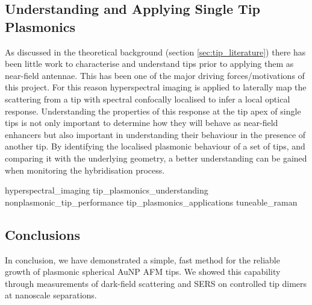 \documentclass[12pt, a4paper, twoside]{book}
\begin{document}
\begin{singlespace}
\chapter{Understanding and Applying Single Tip Plasmonics}
\end{singlespace}


As discussed in the theoretical background (section \ref{sec:tip_literature}) there has been little work to characterise and understand tips prior to applying them as near-field antennae. This has been one of the major {\color{red}driving forces/motivations} of this project. For this reason hyperspectral imaging is applied to laterally map the scattering from a tip with spectral confocally localised to infer a local optical response.
Understanding the properties of this response at the tip apex of single tips is not only important to determine how they will behave as near-field enhancers but also important in understanding their behaviour in the presence of another tip. By identifying the localised plasmonic behaviour of a set of tips, and comparing it with the underlying geometry, a better understanding can be gained when monitoring the hybridisation process.


{hyperspectral_imaging}
{tip_plasmonics_understanding}
{nonplasmonic_tip_performance}
{tip_plasmonics_applications}
{tuneable_raman}

\section{Conclusions}

In conclusion, we have demonstrated a simple, fast method for the reliable growth of plasmonic spherical AuNP AFM tips. We showed this capability through measurements of dark-field scattering and SERS on controlled tip dimers at nanoscale separations.

\ifstandalone
\begin{singlespace}
\fontsize{8pt}{1em}\selectfont
\printbibliography[notcategory=fullcited]
\end{singlespace}
\fi
\end{document}
